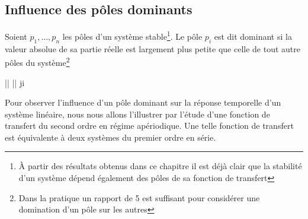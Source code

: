 \subsection{Influence des pôles dominants}
Soient $p_1,\ldots,p_n$ les pôles d'un système stable\footnote{À partir 
des résultats obtenus dans ce chapitre il est déjà clair que la stabilité
d'un système dépend également des pôles de sa fonction de transfert}.
Le pôle $p_i$ est dit dominant si la valeur absolue
de sa partie réelle est largement plus petite que celle de tout autre pôles 
du système\footnote{Dans la pratique un rapport de 5 est 
suffisant pour considérer une domination d'un pôle sur les autres}
\begin{bequation}
    \big|\big| \ll \big|\big|\;\; \forall j\neq i
\end{bequation}
Pour observer l'influence d'un pôle dominant sur 
la réponse temporelle d'un système linéaire, nous
nous allons l'illustrer par l'étude d'une fonction 
de transfert du second ordre en régime apériodique.
Une telle fonction de transfert est équivalente à deux
systèmes du premier ordre en série.

